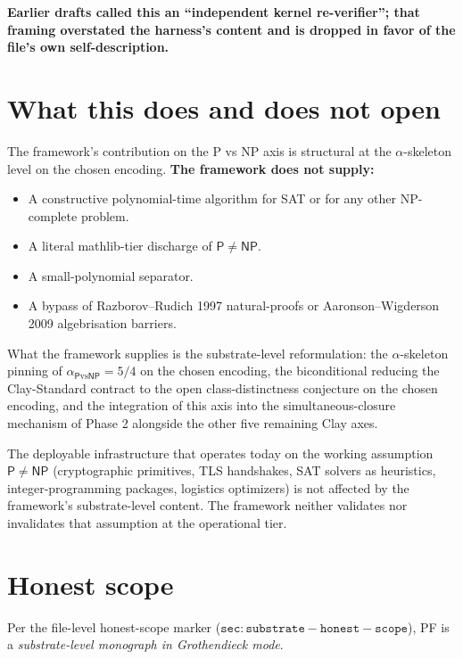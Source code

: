 \documentclass[11pt,a4paper]{article}
\theoremstyle{plain}
\theoremstyle{definition}
\begin{document}
\textbf{Earlier drafts called this an ``independent kernel
re-verifier''; that framing overstated the harness's content and is
dropped in favor of the file's own self-description.}

\section{What this does and does not open}
\label{sec:what-opens}

The framework's contribution on the P vs NP axis is structural at the
$\alpha$-skeleton level on the chosen encoding. \textbf{The
framework does not supply:}
\begin{itemize}[leftmargin=*,nosep]
\item A constructive polynomial-time algorithm for SAT or for any
  other NP-complete problem.
\item A literal mathlib-tier discharge of $\mathsf{P} \neq
  \mathsf{NP}$.
\item A small-polynomial separator.
\item A bypass of Razborov--Rudich 1997 natural-proofs
  \cite{razborov_rudich1997} or Aaronson--Wigderson 2009
  algebrisation \cite{aaronson_wigderson2009} barriers.
\end{itemize}
What the framework supplies is the substrate-level reformulation: the
$\alpha$-skeleton pinning of $\alpha_{\mathsf{P}\mathrm{vs}\mathsf{NP}}
= 5/4$ on the chosen encoding, the biconditional reducing the
Clay-Standard contract to the open class-distinctness conjecture on
the chosen encoding, and the integration of this axis into the
simultaneous-closure mechanism of Phase 2 alongside the other five
remaining Clay axes.

The deployable infrastructure that operates today on the working
assumption $\mathsf{P} \neq \mathsf{NP}$ (cryptographic primitives,
TLS handshakes, SAT solvers as heuristics, integer-programming
packages, logistics optimizers) is not affected by the framework's
substrate-level content. The framework neither validates nor
invalidates that assumption at the operational tier.

\section{Honest scope}
\label{sec:honest-scope}

Per the file-level honest-scope marker
($\mathtt{sec:substrate-honest-scope}$), PF is a
\emph{substrate-level monograph in Grothendieck mode}.
\end{document}
